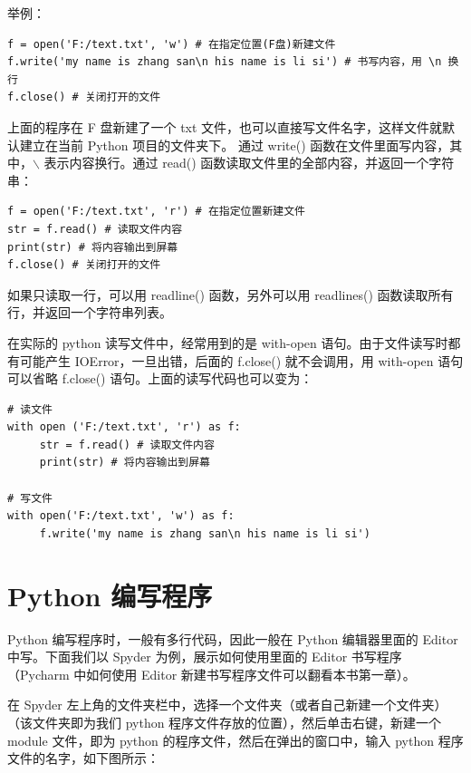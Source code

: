举例：

\begin{lstlisting}[Language=Python]
f = open('F:/text.txt', 'w') # 在指定位置(F盘)新建文件
f.write('my name is zhang san\n his name is li si') # 书写内容，用 \n 换行
f.close() # 关闭打开的文件
\end{lstlisting}

上面的程序在 F 盘新建了一个 txt 文件，也可以直接写文件名字，这样文件就默认建立在当前 Python 项目的文件夹下。 通过 write() 函数在文件里面写内容，其中，$\backslash$ 表示内容换行。通过 read() 函数读取文件里的全部内容，并返回一个字符串：

\begin{lstlisting}[Language=Python]
f = open('F:/text.txt', 'r') # 在指定位置新建文件
str = f.read() # 读取文件内容
print(str) # 将内容输出到屏幕
f.close() # 关闭打开的文件
\end{lstlisting}

如果只读取一行，可以用 readline() 函数，另外可以用 readlines() 函数读取所有行，并返回一个字符串列表。

在实际的 python 读写文件中，经常用到的是 with-open 语句。由于文件读写时都有可能产生 IOError，一旦出错，后面的 f.close() 就不会调用，用 with-open 语句可以省略 f.close() 语句。上面的读写代码也可以变为：

\begin{lstlisting}[Language=Python]
# 读文件
with open ('F:/text.txt', 'r') as f:
     str = f.read() # 读取文件内容
     print(str) # 将内容输出到屏幕

# 写文件
with open('F:/text.txt', 'w') as f:
     f.write('my name is zhang san\n his name is li si')
\end{lstlisting}




\section{Python 编写程序}

Python 编写程序时，一般有多行代码，因此一般在 Python 编辑器里面的 Editor 中写。下面我们以 Spyder 为例，展示如何使用里面的 Editor 书写程序（Pycharm 中如何使用 Editor 新建书写程序文件可以翻看本书第一章）。

在 Spyder 左上角的文件夹栏中，选择一个文件夹（或者自己新建一个文件夹）（该文件夹即为我们 python 程序文件存放的位置），然后单击右键，新建一个 module 文件，即为 python 的程序文件，然后在弹出的窗口中，输入 python 程序文件的名字，如下图所示：


